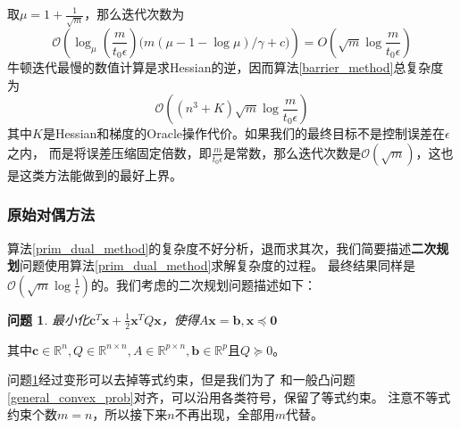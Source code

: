 \documentclass{article}
\newtheorem{problem}{问题}
\begin{document}
取$\mu=1+\frac{1}{\sqrt{m}}$，那么迭代次数为
$$\mathcal O(\log_\mu(\frac{m}{t_0\epsilon})\Big(m(\mu-1-\log\mu)/\gamma+c\Big))=O(\sqrt m\log \frac{m}{t_0\epsilon})$$
牛顿迭代最慢的数值计算是求Hessian的逆，因而算法\ref{barrier_method}总复杂度
为$$\mathcal O((n^3+K)\sqrt m\log \frac{m}{t_0\epsilon})$$
其中$K$是Hessian和梯度的Oracle操作代价。如果我们的最终目标不是控制误差在$\epsilon$之内，
而是将误差压缩固定倍数，即$\frac{m}{t_0\epsilon}$是常数，那么迭代次数是$\mathcal O(\sqrt m)$，这也是这类方法能做到的最好上界。
\label{time_complexity_barrier}
\subsubsection{原始对偶方法}
\label{time_complexity_pd}
算法\ref{prim_dual_method}的复杂度不好分析，退而求其次，我们简要描述\textbf{二次规划}问题使用算法\ref{prim_dual_method}求解复杂度的过程。
最终结果同样是$\mathcal O(\sqrt{m}\log\frac{1}{\epsilon})$的。我们考虑的二次规划问题描述如下：
\begin{problem}
    \label{quad_problem}
    最小化$\bm c^T\bm x+\frac{1}{2}\bm x^TQ\bm x$，使得$A\bm x=\bm b,\bm x\preceq \bm 0$
\end{problem}
其中$\bm c\in \mathbb{R}^n,Q\in \mathbb{R}^{n\times n},A\in\mathbb{R}^{p\times n},\bm b\in \mathbb{R}^p$且$Q\succeq 0$。

问题\ref{quad_problem}经过变形可以去掉等式约束，但是我们为了
和一般凸问题\ref{general_convex_prob}对齐，可以沿用各类符号，保留了等式约束。
注意不等式约束个数$m=n$，所以接下来$n$不再出现，全部用$m$代替。
\end{document}
